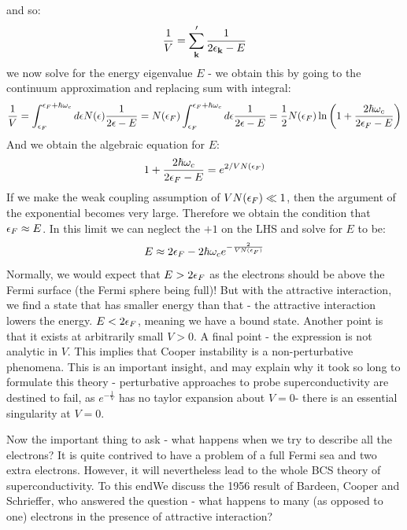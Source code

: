 and so:
\begin{equation}
    \frac{1}{V} = \sum_{\mathbf{k}}' \frac{1}{2\epsilon_{\mathbf{k}} - E}
\end{equation}
we now solve for the energy eigenvalue $E$ - we obtain this by going to the continuum approximation and replacing sum with integral:
\begin{equation}
    \frac{1}{V} = \int_{\epsilon_F}^{\epsilon_F + \hbar \omega_c} d\epsilon N(\epsilon)\frac{1}{2\epsilon - E} = N(\epsilon_F) \int_{\epsilon_F}^{\epsilon_F + \hbar \omega_c}d\epsilon \frac{1}{2\epsilon - E} = \frac{1}{2}N(\epsilon_F)\ln\left(1 + \frac{2\hbar \omega_c}{2\epsilon_F - E}\right)
\end{equation}
And we obtain the algebraic equation for $E$:
\begin{equation}
    1 + \frac{2\hbar \omega_c}{2\epsilon_F - E} = e^{2/VN(\epsilon_F)}
\end{equation}
If we make the weak coupling assumption of $VN(\epsilon_F) \ll 1$, then the argument of the exponential becomes very large. Therefore we obtain the condition that $\epsilon_F \approx E$. In this limit we can neglect the $+1$ on the LHS and solve for $E$ to be:
\begin{equation}
    E \approx 2\epsilon_F - 2\hbar \omega_c e^{-\frac{2}{VN(\epsilon_F)}}
\end{equation}
Normally, we would expect that $E > 2\epsilon_F$ as the electrons should be above the Fermi surface (the Fermi sphere being full)! But with the attractive interaction, we find a state that has smaller energy than that - the attractive interaction lowers the energy. $E < 2\epsilon_F$, meaning we have a bound state. Another point is that it exists at arbitrarily small $V > 0$. A final point - the expression is not analytic in $V$. This implies that Cooper instability is a non-perturbative phenomena. This is an important insight, and may explain why it took so long to formulate this theory - perturbative approaches to probe superconductivity are destined to fail, as $e^{-\frac{1}{V}}$ has no taylor expansion about $V = 0$- there is an essential singularity at $V = 0$.

Now the important thing to ask - what happens when we try to describe all the electrons? It is quite contrived to have a problem of a full Fermi sea and two extra electrons. However, it will nevertheless lead to the whole BCS theory of superconductivity. To this endWe discuss the 1956 result of Bardeen, Cooper and Schrieffer, who answered the question - what happens to many (as opposed to one) electrons in the presence of attractive interaction?


